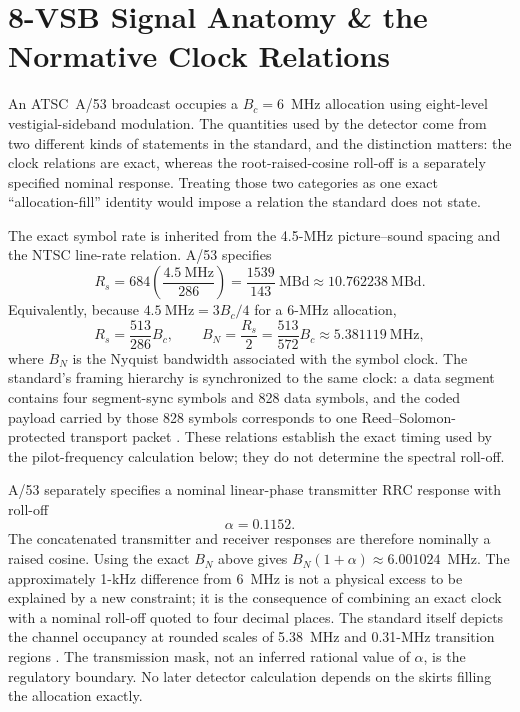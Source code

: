 \section{8-VSB Signal Anatomy \& the Normative Clock Relations}
\label{sec:dtv:vsb}

An ATSC~A/53 broadcast occupies a $B_c=6$~MHz allocation using eight-level
vestigial-sideband modulation.  The quantities used by the detector come from
two different kinds of statements in the standard, and the distinction matters:
the clock relations are exact, whereas the root-raised-cosine roll-off is a
separately specified nominal response.  Treating those two categories as one exact ``allocation-fill'' identity would impose a relation the standard does not state.

The exact symbol rate is inherited from the 4.5-MHz picture--sound spacing and
the NTSC line-rate relation.  A/53 specifies
\begin{equation}
\label{eq:atsc:symbolrate}
R_s = 684\left(\frac{4.5~\mathrm{MHz}}{286}\right)
    = \frac{1539}{143}~\mathrm{MBd}
    \approx 10.762238~\mathrm{MBd}.
\end{equation}
Equivalently, because $4.5~\mathrm{MHz}=3B_c/4$ for a 6-MHz allocation,
\begin{equation}
R_s=\frac{513}{286}B_c,
\qquad
B_N=\frac{R_s}{2}=\frac{513}{572}B_c
    \approx 5.381119~\mathrm{MHz},
\end{equation}
where $B_N$ is the Nyquist bandwidth associated with the symbol clock.  The
standard's framing hierarchy is synchronized to the same clock: a data segment
contains four segment-sync symbols and 828 data symbols, and the coded payload
carried by those 828 symbols corresponds to one Reed--Solomon-protected
transport packet \cite{atsc-a53}.  These relations establish the exact timing
used by the pilot-frequency calculation below; they do not determine the
spectral roll-off.

A/53 separately specifies a nominal linear-phase transmitter RRC response with
roll-off
\begin{equation}
\alpha=0.1152.
\end{equation}
The concatenated transmitter and receiver responses are therefore nominally a
raised cosine.  Using the exact $B_N$ above gives
$B_N(1+\alpha)\approx6.001024$~MHz.  The approximately 1-kHz difference from
6~MHz is not a physical excess to be explained by a new constraint; it is the
consequence of combining an exact clock with a nominal roll-off quoted to four
decimal places.  The standard itself depicts the channel occupancy at rounded
scales of 5.38~MHz and 0.31-MHz transition regions \cite{atsc-a53}.  The
transmission mask, not an inferred rational value of $\alpha$, is the regulatory
boundary.  No later detector calculation depends on the skirts filling the
allocation exactly.

